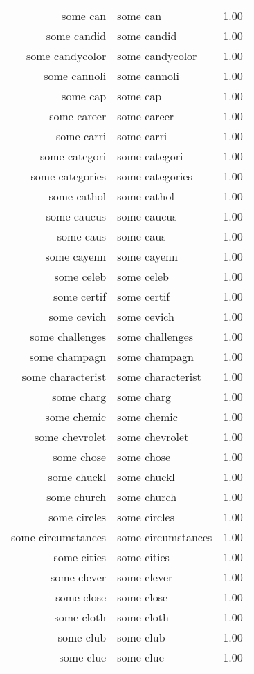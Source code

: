 \begin{table}[ht]
\begin{tabular}{rlr}
  some can & some can & 1.00 \\ 
  some candid & some candid & 1.00 \\ 
  some candycolor & some candycolor & 1.00 \\ 
  some cannoli & some cannoli & 1.00 \\ 
  some cap & some cap & 1.00 \\ 
  some career & some career & 1.00 \\ 
  some carri & some carri & 1.00 \\ 
  some categori & some categori & 1.00 \\ 
  some categories & some categories & 1.00 \\ 
  some cathol & some cathol & 1.00 \\ 
  some caucus & some caucus & 1.00 \\ 
  some caus & some caus & 1.00 \\ 
  some cayenn & some cayenn & 1.00 \\ 
  some celeb & some celeb & 1.00 \\ 
  some certif & some certif & 1.00 \\ 
  some cevich & some cevich & 1.00 \\ 
  some challenges & some challenges & 1.00 \\ 
  some champagn & some champagn & 1.00 \\ 
  some characterist & some characterist & 1.00 \\ 
  some charg & some charg & 1.00 \\ 
  some chemic & some chemic & 1.00 \\ 
  some chevrolet & some chevrolet & 1.00 \\ 
  some chose & some chose & 1.00 \\ 
  some chuckl & some chuckl & 1.00 \\ 
  some church & some church & 1.00 \\ 
  some circles & some circles & 1.00 \\ 
  some circumstances & some circumstances & 1.00 \\ 
  some cities & some cities & 1.00 \\ 
  some clever & some clever & 1.00 \\ 
  some close & some close & 1.00 \\ 
  some cloth & some cloth & 1.00 \\ 
  some club & some club & 1.00 \\ 
  some clue & some clue & 1.00 \\ 

\end{tabular}
\end{table}
